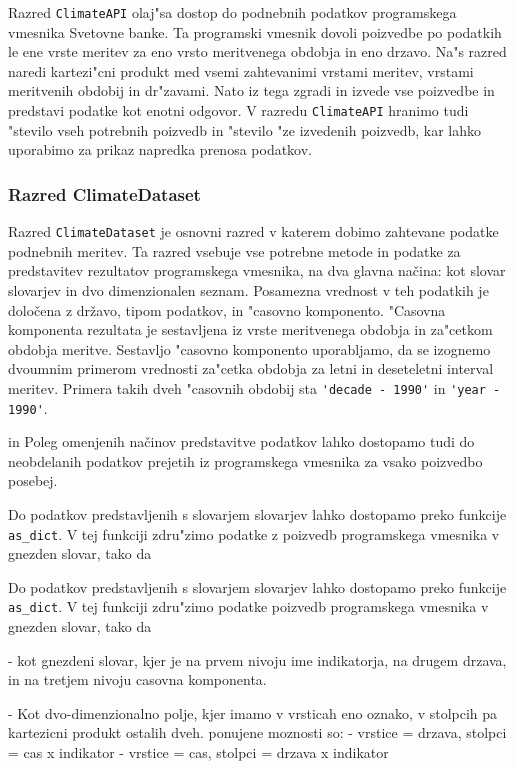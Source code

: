 Razred \verb|ClimateAPI| olaj"sa dostop do podnebnih podatkov programskega
vmesnika Svetovne banke. Ta programski vmesnik dovoli poizvedbe po podatkih le 
ene vrste meritev za eno vrsto meritvenega obdobja in eno drzavo. Na"s razred 
naredi kartezi"cni produkt med vsemi zahtevanimi vrstami meritev, vrstami
meritvenih obdobij in dr"zavami. Nato iz tega zgradi in izvede vse poizvedbe 
in predstavi podatke kot enotni odgovor. V razredu \verb|ClimateAPI| hranimo 
tudi "stevilo vseh potrebnih poizvedb in "stevilo "ze izvedenih poizvedb, kar 
lahko uporabimo za prikaz napredka prenosa podatkov.



\subsubsection{Razred ClimateDataset}

Razred \verb|ClimateDataset| je osnovni razred v katerem dobimo zahtevane 
podatke podnebnih meritev. Ta razred vsebuje vse potrebne metode in podatke za 
predstavitev rezultatov programskega vmesnika, na dva glavna načina: kot slovar
slovarjev in dvo dimenzionalen seznam. Posamezna vrednost v teh podatkih je
določena z državo, tipom podatkov, in "casovno komponento. "Casovna komponenta
rezultata je sestavljena iz vrste meritvenega obdobja in za"cetkom obdobja 
meritve. Sestavljo "casovno komponento uporabljamo, da se izognemo dvoumnim
primerom vrednosti za"cetka obdobja za letni in deseteletni interval meritev.
Primera takih dveh "casovnih obdobij sta \verb|'decade - 1990'| in 
\verb|'year - 1990'|.

in  Poleg omenjenih
načinov predstavitve podatkov lahko dostopamo tudi do neobdelanih podatkov 
prejetih iz programskega vmesnika za vsako poizvedbo posebej.



Do podatkov predstavljenih s slovarjem slovarjev lahko dostopamo preko funkcije
\verb|as_dict|. V tej funkciji zdru"zimo podatke z poizvedb programskega
vmesnika v gnezden slovar, tako da 


Do podatkov predstavljenih s slovarjem slovarjev lahko dostopamo preko funkcije
\verb|as_dict|. V tej funkciji zdru"zimo podatke poizvedb programskega
vmesnika v gnezden slovar, tako da 

 - kot gnezdeni slovar, kjer je na prvem nivoju ime indikatorja, na drugem
   drzava, in na tretjem nivoju casovna komponenta.



 - Kot dvo-dimenzionalno polje, kjer imamo v vrsticah eno oznako, v stolpcih
   pa kartezicni produkt ostalih dveh. ponujene moznosti so:
   - vrstice = drzava, stolpci = cas x indikator
   - vrstice = cas, stolpci = drzava x indikator


